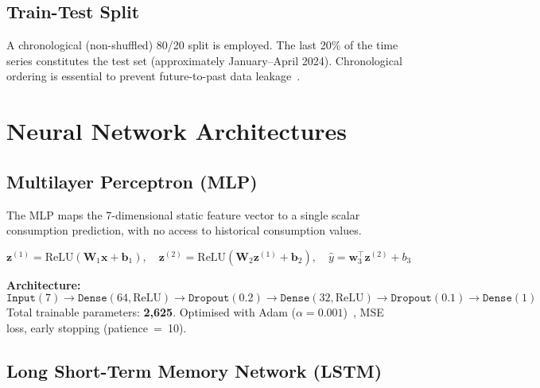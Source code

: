 \documentclass[12pt,a4paper]{article}
\begin{document}
\subsection{Train-Test Split}

A chronological (non-shuffled) 80/20 split is employed. The last 20\% of the
time series constitutes the test set (approximately January--April 2024).
Chronological ordering is essential to prevent future-to-past data
leakage~\cite{cerqueira2020}.

\section{Neural Network Architectures}
\label{sec:models}

\subsection{Multilayer Perceptron (MLP)}
\label{subsec:mlp}

The MLP maps the 7-dimensional static feature vector to a single scalar
consumption prediction, with no access to historical consumption values.

\begin{equation}
  \mathbf{z}^{(1)} = \text{ReLU}(\mathbf{W}_1 \mathbf{x} + \mathbf{b}_1),
  \quad
  \mathbf{z}^{(2)} = \text{ReLU}(\mathbf{W}_2 \mathbf{z}^{(1)} + \mathbf{b}_2),
  \quad
  \hat{y} = \mathbf{w}_3^\top \mathbf{z}^{(2)} + b_3
  \label{eq:mlp}
\end{equation}

\noindent\textbf{Architecture:}
\[
\texttt{Input}(7) \to \texttt{Dense}(64, \text{ReLU}) \to \texttt{Dropout}(0.2) \to
\texttt{Dense}(32, \text{ReLU}) \to \texttt{Dropout}(0.1) \to \texttt{Dense}(1)
\]
Total trainable parameters: \textbf{2,625}. Optimised with Adam
($\alpha = 0.001$)~\cite{kingma2015}, MSE loss, early stopping (patience~=~10).

\subsection{Long Short-Term Memory Network (LSTM)}
\label{subsec:lstm}
\end{document}
